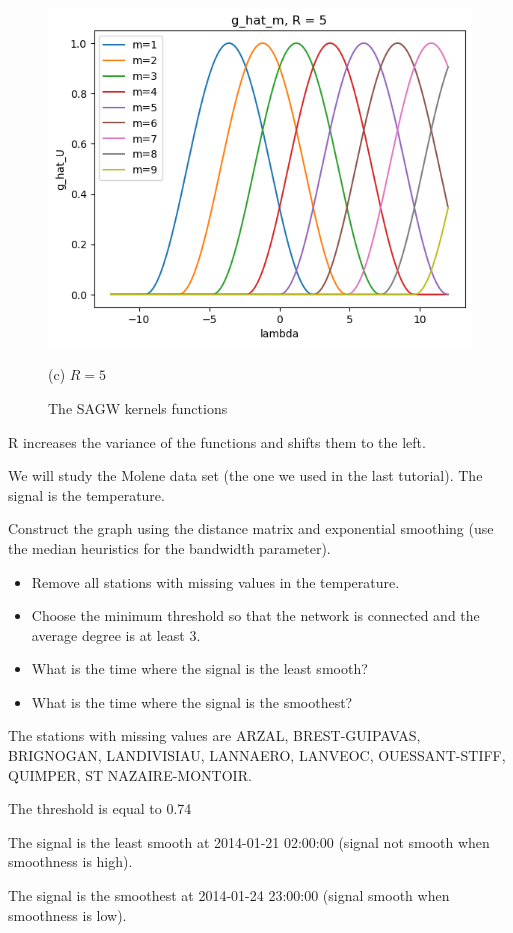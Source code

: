 \documentclass[11pt]{article}
\begin{document}
\begin{solution}
\begin{figure}
    \begin{minipage}[t]{0.32\textwidth}    \centerline{\includegraphics[width=\textwidth]{q3_c.png}}
    \centerline{(c) $R=5$}
    \end{minipage}
    \caption{The SAGW kernels functions}\label{fig:sagw-kernels}
\end{figure}

R increases the variance of the functions and shifts them to the left. 
\end{solution}


\newpage
We will study the Molene data set (the one we used in the last tutorial).
The signal is the temperature.

\begin{exercise}
Construct the graph using the distance matrix and exponential smoothing (use the median heuristics for the bandwidth parameter). 
\begin{itemize}
    \item Remove all stations with missing values in the temperature.
    \item Choose the minimum threshold so that the network is connected and the average degree is at least 3.
    \item What is the time where the signal is the least smooth?
    \item What is the time where the signal is the smoothest?
\end{itemize}
\end{exercise}

\begin{solution}
The stations with missing values are ARZAL, BREST-GUIPAVAS, BRIGNOGAN, LANDIVISIAU, LANNAERO, LANVEOC, OUESSANT-STIFF, QUIMPER, ST NAZAIRE-MONTOIR. 

The threshold is equal to 0.74

The signal is the least smooth at 2014-01-21 02:00:00 (signal not smooth when smoothness is high). 

The signal is the smoothest at 2014-01-24 23:00:00 (signal smooth when smoothness is low).

\end{solution}
\end{document}
